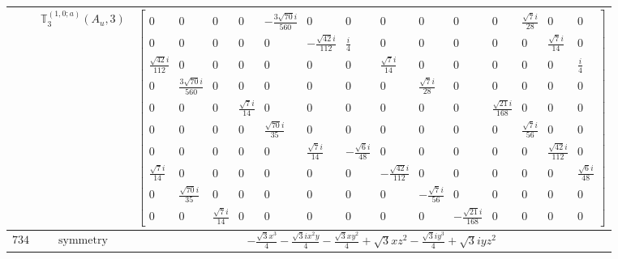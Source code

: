 \documentclass[fleqn,8pt,landscape]{jsarticle}
\begin{document}
\begin{longtable}{ccc}
$  $ & $ \mathbb{T}_{3}^{(1,0;a)}(A_{u},3) $ & $ \begin{bmatrix} 0 & 0 & 0 & 0 & - \frac{3 \sqrt{70} i}{560} & 0 & 0 & 0 & 0 & 0 & 0 & \frac{\sqrt{7} i}{28} & 0 & 0 \\ 0 & 0 & 0 & 0 & 0 & - \frac{\sqrt{42} i}{112} & \frac{i}{4} & 0 & 0 & 0 & 0 & 0 & \frac{\sqrt{7} i}{14} & 0 \\ \frac{\sqrt{42} i}{112} & 0 & 0 & 0 & 0 & 0 & 0 & \frac{\sqrt{7} i}{14} & 0 & 0 & 0 & 0 & 0 & \frac{i}{4} \\ 0 & \frac{3 \sqrt{70} i}{560} & 0 & 0 & 0 & 0 & 0 & 0 & \frac{\sqrt{7} i}{28} & 0 & 0 & 0 & 0 & 0 \\ 0 & 0 & 0 & \frac{\sqrt{7} i}{14} & 0 & 0 & 0 & 0 & 0 & 0 & \frac{\sqrt{21} i}{168} & 0 & 0 & 0 \\ 0 & 0 & 0 & 0 & \frac{\sqrt{70} i}{35} & 0 & 0 & 0 & 0 & 0 & 0 & \frac{\sqrt{7} i}{56} & 0 & 0 \\ 0 & 0 & 0 & 0 & 0 & \frac{\sqrt{7} i}{14} & - \frac{\sqrt{6} i}{48} & 0 & 0 & 0 & 0 & 0 & \frac{\sqrt{42} i}{112} & 0 \\ \frac{\sqrt{7} i}{14} & 0 & 0 & 0 & 0 & 0 & 0 & - \frac{\sqrt{42} i}{112} & 0 & 0 & 0 & 0 & 0 & \frac{\sqrt{6} i}{48} \\ 0 & \frac{\sqrt{70} i}{35} & 0 & 0 & 0 & 0 & 0 & 0 & - \frac{\sqrt{7} i}{56} & 0 & 0 & 0 & 0 & 0 \\ 0 & 0 & \frac{\sqrt{7} i}{14} & 0 & 0 & 0 & 0 & 0 & 0 & - \frac{\sqrt{21} i}{168} & 0 & 0 & 0 & 0 \end{bmatrix} $ \\ \hline
$ 734 $ & $ \text{symmetry} $ & $ - \frac{\sqrt{3} x^{3}}{4} - \frac{\sqrt{3} i x^{2} y}{4} - \frac{\sqrt{3} x y^{2}}{4} + \sqrt{3} x z^{2} - \frac{\sqrt{3} i y^{3}}{4} + \sqrt{3} i y z^{2} $ \\

\end{longtable}
\end{document}

